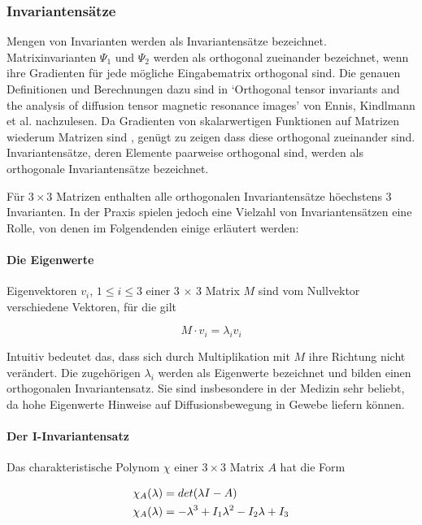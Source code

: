 \documentclass[a4paper,fontsize=12pt,toc=bib,halfparskip]{scrartcl}
\begin{document}
\subsubsection{Invariantens\"atze} 
Mengen von Invarianten werden als Invariantens\"atze bezeichnet.
Matrixinvarianten $\Psi_1$ und $\Psi_2$ werden als orthogonal zueinander bezeichnet, wenn ihre Gradienten f\"ur jede m\"ogliche Eingabematrix orthogonal sind. Die genauen Definitionen und Berechnungen dazu sind in `Orthogonal tensor invariants and the analysis of diffusion tensor magnetic resonance images' von Ennis, Kindlmann et al. \cite{ennis2006orthogonal} nachzulesen. Da Gradienten von skalarwertigen Funktionen auf Matrizen wiederum Matrizen sind \cite[S.~137]{ennis2006orthogonal}, gen\"ugt zu zeigen dass diese orthogonal zueinander sind. Invariantens\"atze, deren Elemente paarweise orthogonal sind, werden als orthogonale Invariantens\"atze bezeichnet.

F\"ur $3\times 3$ Matrizen enthalten alle orthogonalen Invariantens\"atze h\"oechstens 3 Invarianten. In der Praxis spielen jedoch eine Vielzahl von Invariantens\"atzen eine Rolle, von denen im Folgendenden einige erl\"autert werden:

\paragraph{Die Eigenwerte}

Eigenvektoren $v_i$, $1\leq i\leq 3$ einer 3 $\times$ 3 Matrix $M$ sind vom Nullvektor verschiedene Vektoren, f\"ur die gilt

\begin{equation}
	M \cdot v_i = \lambda_i v_i
\end{equation}

Intuitiv bedeutet das, dass sich durch Multiplikation mit $M$ ihre Richtung nicht ver\"andert. Die zugeh\"origen $\lambda_i$ werden als Eigenwerte bezeichnet und bilden einen orthogonalen Invariantensatz. Sie sind insbesondere in der Medizin sehr beliebt, da hohe Eigenwerte Hinweise auf Diffusionsbewegung in Gewebe liefern k\"onnen.

\paragraph{Der I-Invariantensatz}
Das charakteristische Polynom $\chi$ einer $3\times3$ Matrix $A$ hat die Form

\begin{equation}
	\centering
	\begin{split}
	&\chi_A(\lambda) = det(\lambda I - A)\\
	&\chi_A(\lambda) = -\lambda^3 + I_1\lambda^2 - I_2\lambda + I_3
	\end{split}
\end{equation}
\end{document}
